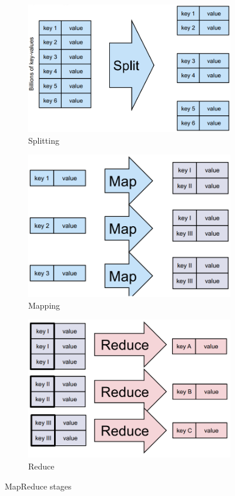 \documentclass[11pt,oneside,a4paper]{article}
\begin{document}
\begin{figure}[t!]
	\centering
	\begin{subfigure}[t]{.3\textwidth}
		\centering
		\includegraphics[width=0.9\linewidth]{figures/mr_splitting}
		\caption{Splitting}
		\label{fig:mrsplitting}
	\end{subfigure}%
	\begin{subfigure}[t]{.3\textwidth}
		\centering
		\includegraphics[width=0.9\linewidth]{figures/mr_mapping}
		\caption{Mapping}
		\label{fig:mrmapping}
	\end{subfigure}
	\begin{subfigure}[t]{.3\textwidth}
		\centering
		\includegraphics[width=0.9\linewidth]{figures/mr_reduce}
		\caption{Reduce}
		\label{fig:mrreduce}
	\end{subfigure}
	\caption{MapReduce stages}
\end{figure}
\end{document}
